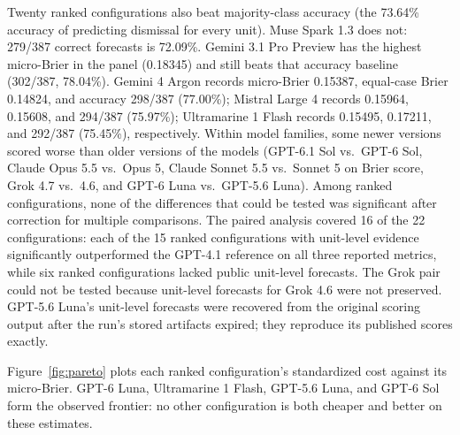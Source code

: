 \documentclass[11pt]{article}
\begin{document}
Twenty ranked configurations also beat majority-class accuracy (the 73.64\% accuracy of predicting dismissal for every unit). Muse Spark 1.3 does not: 279/387 correct forecasts is 72.09\%. Gemini 3.1 Pro Preview has the highest micro-Brier in the panel (0.18345) and still beats that accuracy baseline (302/387, 78.04\%). Gemini 4 Argon records micro-Brier 0.15387, equal-case Brier 0.14824, and accuracy 298/387 (77.00\%); Mistral Large 4 records 0.15964, 0.15608, and 294/387 (75.97\%); Ultramarine 1 Flash records 0.15495, 0.17211, and 292/387 (75.45\%), respectively. Within model families, some newer versions scored worse than older versions of the models (GPT-6.1 Sol vs.\ GPT-6 Sol, Claude Opus 5.5 vs.\ Opus 5, Claude Sonnet 5.5 vs.\ Sonnet 5 on Brier score, Grok 4.7 vs.\ 4.6, and GPT-6 Luna vs.\ GPT-5.6 Luna). Among ranked configurations, none of the differences that could be tested was significant after correction for multiple comparisons. The paired analysis covered 16 of the 22 configurations: each of the 15 ranked configurations with unit-level evidence significantly outperformed the GPT-4.1 reference on all three reported metrics, while six ranked configurations lacked public unit-level forecasts. The Grok pair could not be tested because unit-level forecasts for Grok 4.6 were not preserved. GPT-5.6 Luna's unit-level forecasts were recovered from the original scoring output after the run's stored artifacts expired; they reproduce its published scores exactly.

Figure~\ref{fig:pareto} plots each ranked configuration's standardized cost against its micro-Brier. GPT-6 Luna, Ultramarine 1 Flash, GPT-5.6 Luna, and GPT-6 Sol form the observed frontier: no other configuration is both cheaper and better on these estimates.
\end{document}
